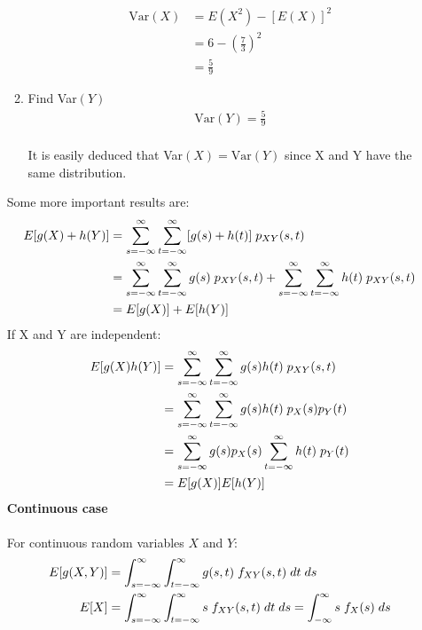 \documentclass[,oneside]{article}
\begin{document}
\begin{enumerate}
\begin{enumerate}
\begin{align*}
\text{Var}(X)&= E(X^2)-[E(X)]^2\\
&= 6- \left (\frac{7}{3} \right )^2\\
&= \frac{5}{9}
\end{align*}
\item Find Var$(Y)$
\begin{align*}
\text{Var}(Y) = \frac{5}{9}
\end{align*}\\
It is easily deduced that Var$(X) =\text{Var}(Y)$ since X and Y have the same distribution.
\end{enumerate}
Some more important results are:
\begin{align*}
E[g(X)+h(Y)]&= \sum_{s=-\infty}^{\infty} \sum_{t=-\infty}^{\infty} [g(s)+h(t)]\hspace{0.1cm}p_{XY}(s,t)\\
&= \sum_{s=-\infty}^{\infty} \sum_{t=-\infty}^{\infty} g(s)\hspace{0.1cm}p_{XY}(s,t) + \sum_{s=-\infty}^{\infty} \sum_{t=-\infty}^{\infty} h(t)\hspace{0.1cm}p_{XY}(s,t)\\
&= E[g(X)]+E[h(Y)]
\end{align*}
If X and Y are independent:
\begin{align*}
E[g(X)h(Y)]&= \sum_{s=-\infty}^{\infty} \sum_{t=-\infty}^{\infty} g(s)h(t)\hspace{0.1cm}p_{XY}(s,t)\\
&= \sum_{s=-\infty}^{\infty} \sum_{t=-\infty}^{\infty} g(s)h(t)\hspace{0.1cm}p_{X}(s)p_{Y}(t)\\
&= \sum_{s=-\infty}^{\infty} g(s)p_X(s)\sum_{t=-\infty}^{\infty}h(t)\hspace{0.1cm}p_{Y}(t)\\
&=E[g(X)]E[h(Y)]
\end{align*}
\textbf{Continuous case}\\ \\
For continuous random variables $X$ and $Y$:\\
\begin{align*}
E[g(X,Y)]&=\int_{s=-\infty}^{\infty} \int_{t=-\infty}^{\infty}g(s,t)\hspace{0.1cm}f_{XY}(s,t)\hspace{0.1cm}dt\hspace{0.1cm}ds\\
E[X]&=\int_{s=-\infty}^{\infty} \int_{t=-\infty}^{\infty}s\hspace{0.1cm}f_{XY}(s,t)\hspace{0.1cm}dt\hspace{0.1cm}ds= \int_{-\infty}^{\infty} s\hspace{0,1cm}f_X(s)\hspace{0.1cm}ds\\

\end{align*}
\end{enumerate}
\end{document}
